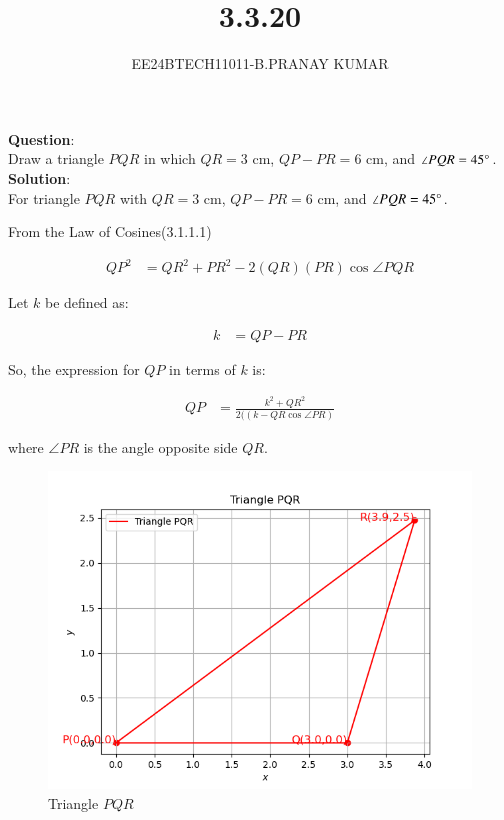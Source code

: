 \documentclass[journal]{IEEEtran}
\begin{document}

\vspace{3cm}

\title{3.3.20}
\author{EE24BTECH11011-B.PRANAY KUMAR
}
 \maketitle
{\let\newpage\relax\maketitle}

\renewcommand{\thefigure}{\theenumi}
\renewcommand{\thetable}{\theenumi}
\setlength{\intextsep}{10pt} %


\renewcommand{\thetable}{\theenumi}



\textbf{Question}:\\
Draw a triangle $PQR$ in which $QR = 3$ cm, $QP - PR = 6$ cm, and $\angle PQR = 45\degree$.\\

\textbf{Solution}:\\
For triangle $PQR$ with $QR = 3$ cm, $QP - PR = 6$ cm, and $\angle PQR = 45\degree$.

From the Law of Cosines(3.1.1.1)

\begin{align}
	QP^2 &= QR^2 + PR^2 - 2 (QR) ( PR )  \cos\angle PQR 
\end{align}

Let $k$ be defined as:

\begin{align}
    k &= QP - PR
\end{align}

So, the expression for $QP$ in terms of $k$ is:

\begin{align}
	QP &= \frac{k^2 + QR^2}{2 ( \left(k - QR  \cos\angle PR\right)}
\end{align}

where $\angle PR$ is the angle opposite side $QR$.\\

 
\begin{figure}[h!]
   \centering
   \includegraphics[width=0.7\linewidth]{figs/triangle_pqr_plot.png}
   \caption{Triangle $PQR$}
\end{figure}
\end{document}
